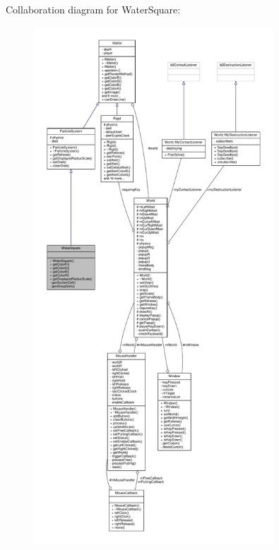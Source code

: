 Collaboration diagram for Water\+Square\+:
\nopagebreak
\begin{figure}[H]
\begin{center}
\leavevmode
\includegraphics[height=550pt]{classWaterSquare__coll__graph}
\end{center}
\end{figure}
